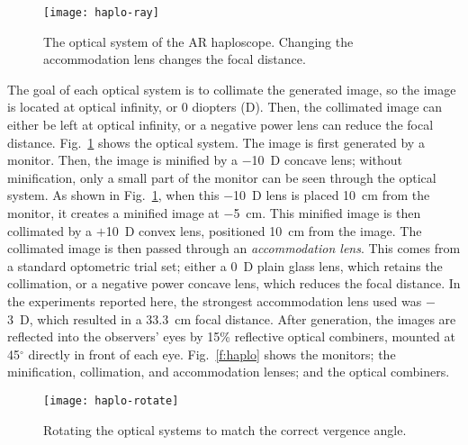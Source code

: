 \documentclass[10pt,journal,compsoc]{IEEEtran}
\newlength{\FigWidth}
\begin{document}
\begin{figure}[!t]
\centering
\texttt{[image: haplo-ray]}
\caption{The optical system of the AR haploscope.  Changing the accommodation lens changes the focal distance.}
\label{f:ray}
\end{figure}

The goal of each optical system is to collimate the generated image, so the image is located at optical infinity, or 0 diopters (D).  Then, the collimated image can either be left at optical infinity, or a negative power lens can reduce the focal distance.  Fig.~\ref{f:ray} shows the optical system.  The image is first generated by a monitor. 
Then, the image is minified by a $-$10~D concave lens;
without minification, only a small part of the monitor can be seen through the optical system.  As shown in Fig.~\ref{f:ray}, when this $-$10~D lens is placed 10~cm from the monitor, it creates a minified image at $-$5~cm.  This minified image is then collimated by a $+$10~D convex lens, 
positioned 10~cm from the image.  The collimated image is then passed through an \emph{accommodation lens}.  This comes from a standard optometric trial set; either a 0~D plain glass lens, which retains the collimation, or a negative power concave lens, which reduces the focal distance.  In the experiments reported here, the strongest accommodation lens used was $-$3~D, which resulted in a 33.3~cm focal distance.  
After generation, the images are reflected into the observers' eyes by 15\% reflective optical combiners, mounted at 45$^{\circ}$ directly in front of each eye.  
Fig.~\ref{f:haplo} shows the monitors; the minification, collimation, and accommodation lenses; and the optical combiners.

\begin{figure}[!t]
\centering
\texttt{[image: haplo-rotate]}
\caption{Rotating the optical systems to match the correct vergence angle.}
\label{f:rotate}
\end{figure}
\end{document}
